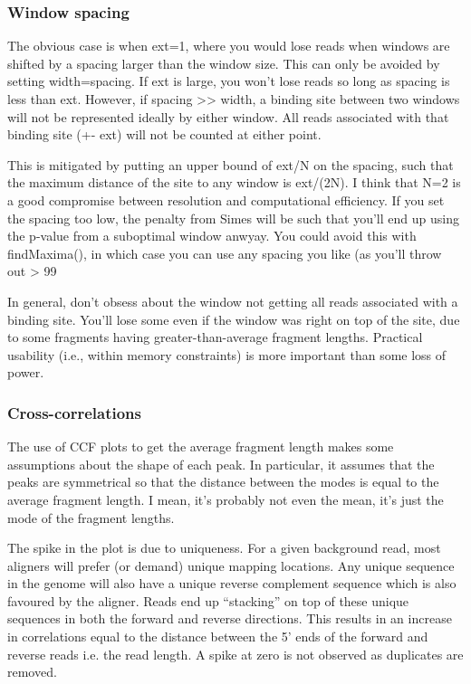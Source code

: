 \documentclass[12pt]{report}
\begin{document}
\subsubsection*{Window spacing}

The obvious case is when ext=1, where you would lose reads when windows are shifted by a spacing larger than the window size.
This can only be avoided by setting width=spacing.
If ext is large, you won't lose reads so long as spacing is less than ext. 
However, if spacing >> width, a binding site between two windows will not be represented ideally by either window.
All reads associated with that binding site (+- ext) will not be counted at either point.

This is mitigated by putting an upper bound of ext/N on the spacing, such that the maximum distance of the site to any window is ext/(2N).
I think that N=2 is a good compromise between resolution and computational efficiency.
If you set the spacing too low, the penalty from Simes will be such that you'll end up using the p-value from a suboptimal window anwyay.
You could avoid this with findMaxima(), in which case you can use any spacing you like (as you'll throw out > 99%

In general, don't obsess about the window not getting all reads associated with a binding site.
You'll lose some even if the window was right on top of the site, due to some fragments having greater-than-average fragment lengths.
Practical usability (i.e., within memory constraints) is more important than some loss of power.

\subsubsection*{Cross-correlations}

The use of CCF plots to get the average fragment length makes some assumptions about the shape of each peak. 
In particular, it assumes that the peaks are symmetrical so that the distance between the modes is equal to the average fragment length. 
I mean, it's probably not even the mean, it's just the mode of the fragment lengths. 

The spike in the plot is due to uniqueness. 
For a given background read, most aligners will prefer (or demand) unique mapping locations. 
Any unique sequence in the genome will also have a unique reverse complement sequence which is also favoured by the aligner. 
Reads end up ``stacking'' on top of these unique sequences in both the forward and reverse directions. 
This results in an increase in correlations equal to the distance between the 5' ends of the forward and reverse reads i.e. the read length. 
A spike at zero is not observed as duplicates are removed.
\end{document}
